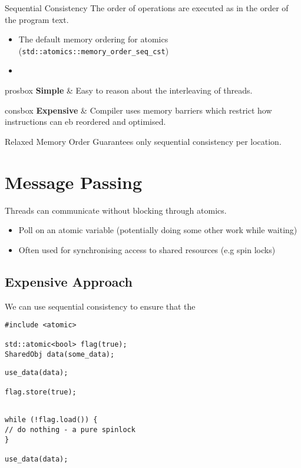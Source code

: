 \begin{definitionbox}{Sequential Consistency}
  The order of operations are executed as in the order of the program text.
  \begin{itemize}
    \item The default memory ordering for atomics (\texttt{std::atomics::memory_order_seq_cst})
    \item 
  \end{itemize}
  \begin{tabbox}{prosbox}
    \textbf{Simple} & Easy to reason about the interleaving of threads. \\
  \end{tabbox}
  \begin{tabbox}{consbox}
    \textbf{Expensive} & Compiler uses memory barriers which restrict how instructions can eb reordered and optimised. \\
  \end{tabbox}
\end{definitionbox}

\begin{definitionbox}{Relaxed Memory Order}
  Guarantees only sequential consistency per location.
\end{definitionbox}

\section{Message Passing}
Threads can communicate without blocking through atomics.
\begin{itemize}
  \item Poll on an atomic variable (potentially doing some other work while waiting)
  \item Often used for synchronising access to shared resources (e.g spin locks)
\end{itemize} 

\subsection{Expensive Approach}
We can use sequential consistency to ensure that the 
\begin{verbatim}  
#include <atomic>

std::atomic<bool> flag(true);
SharedObj data(some_data);
\end{verbatim}
\begin{minipage}{.49\textwidth}
  \begin{verbatim}
use_data(data);

flag.store(true);


  \end{verbatim}
\end{minipage}
\hfill
\begin{minipage}{.49\textwidth}
  \begin{verbatim}
while (!flag.load()) {
// do nothing - a pure spinlock
}

use_data(data);
  \end{verbatim}
\end{minipage}

